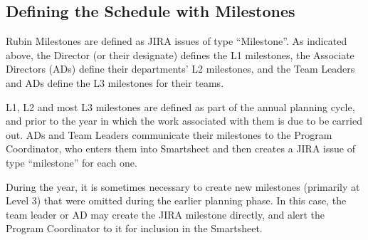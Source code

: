 \subsection{Defining the Schedule with Milestones}

Rubin Milestones are defined as \gls{JIRA} issues of type ``Milestone''. As indicated above, the Director (or their designate) defines the L1 milestones, the Associate Directors (ADs) define their departments' L2 milestones, and the Team Leaders and ADs define the L3 milestones for their teams.

L1, L2 and most L3 milestones are defined as part of the annual planning cycle, and prior to the year in which the work associated with them is due to be carried out. ADs and Team Leaders communicate their milestones to the Program Coordinator, who enters them into Smartsheet and then creates a \gls{JIRA} issue of type ``milestone'' for each one.

During the year, it is sometimes necessary to create new milestones (primarily at Level 3) that were omitted during the earlier planning phase. In this case, the team leader or AD may create the \gls{JIRA} milestone directly, and alert the Program Coordinator to it for inclusion in the Smartsheet.

